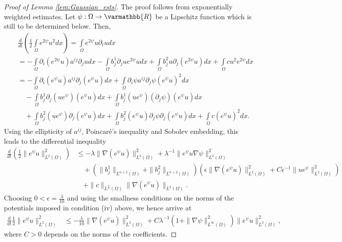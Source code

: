 \documentclass[12pt,twoside]{amsart}
\numberwithin{equation}{section}
\renewcommand{\leq}{\leqslant}
\renewcommand{\mathbb}{\varmathbb}
\newcommand {\R} {\mathbb{R}} \newcommand {\Z} {\mathbb{Z}}
\newcommand {\p} {\partial}
\begin{document}
\begin{proof}[Proof of Lemma \ref{lem:Gaussian_ests}]
The proof follows from exponentially weighted estimates.
Let $\psi: \Omega \rightarrow \R$ be a Lipschitz function which is still to be determined below. Then,
\begin{eqnarray*}
&&\frac{d}{dt}\left( \frac{1}{2} \int\limits_{\Omega} e^{2\psi} u^2 dx \right)
= \int\limits_{\Omega} e^{2\psi} u \p_t u dx
\\
&&= - \int\limits_{\Omega} \p_i (e^{2\psi} u) a^{ij} \p_j u dx
- \int\limits_{\Omega} b_j^1 \p_j u e^{2\psi} u dx
 + \int\limits_{\Omega} b_j^2 u \p_j (e^{2 \psi} u) dx 
+ \int\limits_{\Omega} c u^2 e^{2 \psi} dx
\\
&&= -\int\limits_{\Omega} \p_i(e^{\psi} u) a^{ij} \p_j (e^{\psi} u) dx  + \int\limits_{\Omega} \p_i \psi a^{ij}\p_j \psi (e^{\psi} u)^2 dx \\
&& \quad - \int\limits_{\Omega} b_j^1 \p_j (u e^{\psi}) (e^{\psi} u) dx + \int\limits_{\Omega} b_j^1 (u e^{\psi}) (\p_j \psi) (e^{\psi} u) dx\\
&& \quad + \int\limits_{\Omega} b_j^2 (u e^{\psi}) \p_j (e^{\psi} u) dx + \int\limits_{\Omega} b_j^2 (e^{\psi} u) \p_j \psi \p_j (e^{\psi} u) dx + \int\limits_{\Omega} c (e^{\psi}u)^2 dx.
\end{eqnarray*}
Using the ellipticity of $a^{ij}$, Poincar\'e's inequality and Sobolev embedding, this leads to the differential inequality
\begin{align*}
\frac{d}{dt} \left( \frac{1}{2} \| e^{\psi} u\|_{L^2(\Omega)}^2 \right)
&\leq - \lambda \|\nabla (e^{\psi} u)\|_{L^2(\Omega)}^2
 + \lambda^{-1} \|e^{\psi} u \nabla \psi \|_{L^2(\Omega)}^2\\
 & \quad 
+ (\|b_j^1\|_{L^{n+2}(\Omega)} + \|b_j^2\|_{L^{n+2}(\Omega)})(\epsilon \|\nabla (e^{\psi}u)\|_{L^2(\Omega)}^2 + C \epsilon^{-1}\|u e^{\psi}\|_{L^2(\Omega)}^2)\\
& \quad + \|c\|_{L^{\frac{n}{2}}(\Omega)} \|\nabla( e^{\psi}u)\|_{L^{2}(\Omega)}.
\end{align*}
Choosing $0<\epsilon = \frac{\lambda}{10}$ and using the smallness conditions on the norms of the potentials imposed in condition (iv) above, we hence arrive at 
\begin{align*}
\frac{d}{dt} \frac{1}{2} \| e^{\psi} u\|_{L^2(\Omega)}^2
&\leq - \frac{\lambda}{10} \|\nabla (e^{\psi} u)\|_{L^2(\Omega)}^2
 + C\lambda^{-1}( 1+ \|\nabla \psi\|_{L^{\infty}(\Omega)}^2)\|e^{\psi} u  \|_{L^2(\Omega)}^2,
\end{align*}
where $C>0$ depends on the norms of the coefficients.

\end{proof}
\end{document}

